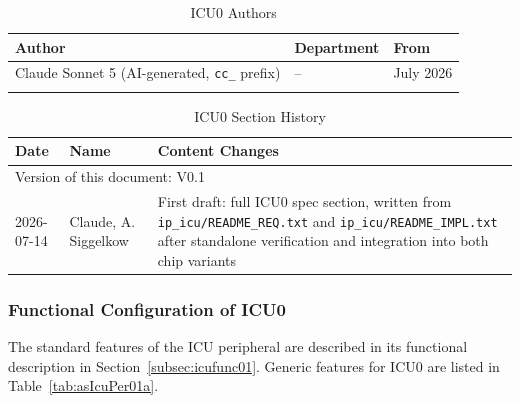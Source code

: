 \begin{table}[H]
\caption{ICU0 Authors}
\label{tab:icuauth01}
\centering
\begin{tabularx}{\textwidth}{|X |X |X|}
  \hline
  Author & Department & From \\
  \hline
  \hline
  Claude Sonnet 5 (AI-generated, \texttt{cc\_} prefix) & -- & July 2026 \\
  \hline
  & & \\
  \hline
\end{tabularx}
\end{table}

\begin{table}[H]
\caption{ICU0 Section History}
\label{tab:icuhistory01}
\centering
\begin{tabularx}{\textwidth}{|X |X |X|}
  \hline
  Date & Name & Content Changes \\
  \hline
  \multicolumn{3}{|l|}{Version of this document: V0.1} \\
  \hline
  2026-07-14 & Claude, A. Siggelkow & First draft: full ICU0 spec section,
    written from \texttt{ip\_icu/README\_REQ.txt} and
    \texttt{ip\_icu/README\_IMPL.txt} after standalone verification and
    integration into both chip variants \\
  \hline
\end{tabularx}
\end{table}

\subsubsection{Functional Configuration of ICU0}

The standard features of the ICU peripheral are described in its
functional description in Section~\ref{subsec:icufunc01}.
Generic features for ICU0 are listed in Table~\ref{tab:asIcuPer01a}.

